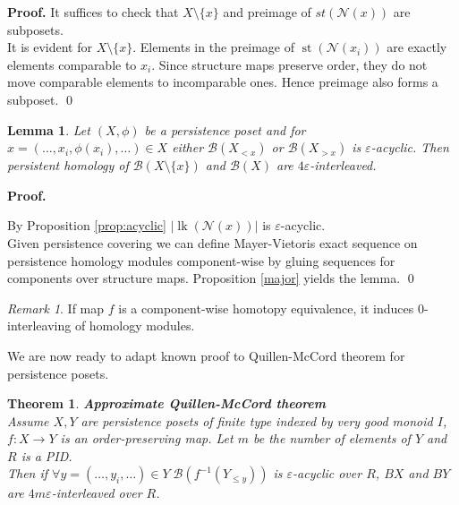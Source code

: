 \documentclass[a4paper, 12pt]{article}
\newcounter{stmcounter}[section]
\newcounter{thcounter}
\numberwithin{equation}{section}
\newtheorem{lemma}[stmcounter]{Lemma}
\newtheorem{theorem}[thcounter]{Theorem}
\theoremstyle{definition}
\theoremstyle{remark}
\newtheorem{remark}[stmcounter]{Remark}
\newenvironment{pf}{\noindent\textbf{Proof.}}{\qed}
\begin{document}
\begin{pf}
  It suffices to check that $X \setminus \{x\}$ and preimage of $st(\mathcal{N}(x))$ are subposets.\\

  It is evident for $X \setminus \{x\}$. Elements in the preimage of $\operatorname{st}(\mathcal{N}(x_i))$ are exactly elements comparable to $x_i$. Since structure maps preserve order, they do not move comparable elements to incomparable ones. Hence preimage also forms a subposet.
\end{pf}\\

\begin{lemma}
  Let $(X,\phi)$ be a persistence poset and for $x=(\ldots,x_i,\phi(x_i),\ldots) \in X$ either $\mathcal{B}(X_{< x})$ or $\mathcal{B}(X_{> x})$ is $\varepsilon$-acyclic. Then persistent homology of $\mathcal{B}(X \setminus \{x\})$ and $\mathcal{B}(X)$ are $4\varepsilon$-interleaved.
\end{lemma}

\begin{pf} ~ \par
  By Proposition \ref{prop:acyclic} $\left|\operatorname{lk}(\mathcal{N}(x))\right|$ is $\varepsilon$-acyclic.\\

  Given persistence covering we can define Mayer-Vietoris exact sequence on persistence homology modules component-wise by gluing sequences for components over structure maps. Proposition \ref{major} yields the lemma.
\end{pf}

\begin{remark}
  If map $f$ is a component-wise homotopy equivalence, it induces $0$-interleaving of homology modules.
\end{remark}

We are now ready to adapt known proof to Quillen-McCord theorem for persistence posets.

\begin{theorem} \textbf{Approximate Quillen-McCord theorem}\\
  Assume $X, Y$ are persistence posets of finite type indexed by very good monoid $I$, $f : X \to Y$ is an order-preserving map. Let $m$ be the number of elements of $Y$ and $R$ is a PID.\\

  Then if $\forall y=(\ldots,y_i,\ldots) \in Y\;\mathcal{B}(f^{-1}(Y_{\leqslant y}))$ is $\varepsilon$-acyclic over $R$, $BX$ and $BY$ are $4m\varepsilon$-interleaved over $R$.\\
\end{theorem}
\end{document}
